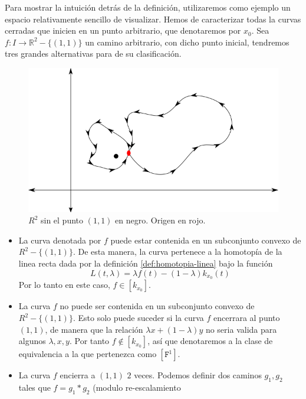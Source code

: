 {\begin{ejemplo} \label{ex:R2-11}
Para mostrar la intuición detrás de la definición, utilizaremos como
ejemplo un espacio relativamente sencillo de visualizar. Hemos de
caracterizar todas la curvas cerradas que inicien en un punto
arbitrario, que denotaremos por \(x_0\). Sea \(f : I \to \mathbb{R}^2 -
\{(1,1)\}\) un camino arbitrario, con dicho punto inicial, tendremos
tres grandes alternativas para de su clasificación.
\begin{figure}[h]
  \centering
  \includegraphics[scale=0.5]{./imagenes/R2-punto.png}
  \caption{\(R^2\) sin el punto \((1,1)\) en negro. Origen en rojo. }
  \label{fig:R2-sin-punto}
\end{figure}
\begin{itemize}
\item La curva denotada por \(f\) puede estar contenida en un subconjunto
  convexo de \(R^2 - \{(1,1)\}\). De esta manera, la curva pertenece a la
  homotopía de la linea recta dada por la definición
  \ref{def:homotopia-linea} bajo la función
  \[ L (t,\lambda) = \lambda f (t) - (1 - \lambda) k_{x_0} (t)\]
  Por lo tanto en este caso, \(f \in [k_{x_0}]\).
\item La curva \(f\) no puede ser contenida en un subconjunto convexo de
  \(R^2 - \{ (1,1)\}\). Esto solo puede suceder si la curva \(f\)
  encerrara al punto \((1,1)\), de manera que la relación \(\lambda x +
  (1 - \lambda) y\) no seria valida para algunos \(\lambda, x, y\). Por
  tanto \(f \not \in [k_{x_0}]\), así que denotaremos a la clase de
  equivalencia a la que pertenezca como \([\mathtt{F}^1]\).
\item La curva \(f\) encierra a \((1,1)\) \(2\) veces. Podemos definir dos
  caminos \(g_1, g_2\) tales que \(f = g_1 * g_2\) (modulo re-escalamiento

\end{itemize}
\end{ejemplo}}
